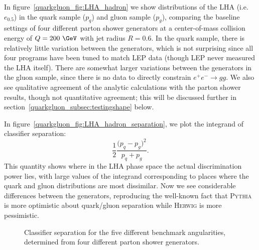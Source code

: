 \documentclass[11pt]{cernrep}
\begin{document}
In figure~\ref{quarkgluon_fig:LHA_hadron} we show distributions of the LHA (i.e.~$e_{0.5}$) in the quark sample ($p_q$) and gluon sample ($p_g$), comparing the baseline settings of four different parton shower generators at a center-of-mass collision energy of $Q = 200~\GeV$ with jet radius $R = 0.6$. In the quark sample, there is relatively little variation between the generators, which is not surprising since all four programs have been tuned to match LEP data (though LEP never measured the LHA itself).  There are somewhat larger variations between the generators in the gluon sample, since there is no data to directly constrain $e^+ e^- \to gg$.  We also see qualitative agreement of the analytic calculations with the parton shower results, though not quantitative agreement; this will be discussed further in section~\ref{quarkgluon_subsec:testingshape} below.  


In figure~\ref{quarkgluon_fig:LHA_hadron_separation}, we plot the integrand of classifier separation:
\begin{equation}
\label{eq:deltaintegrand}
\frac{1}{2} \frac{\bigl(p_q - p_g\bigr)^2}{p_q + p_g}.
\end{equation}
This quantity shows where in the LHA phase space the actual discrimination power lies, with large values of the integrand corresponding to places where the quark and gluon distributions are most dissimilar.  Now we see considerable differences between the generators, reproducing the well-known fact that \textsc{Pythia} is more optimistic about quark/gluon separation while \textsc{Herwig} is more pessimistic.

\begin{figure}
\centering
{}
\caption{Classifier separation for the five different benchmark angularities, determined from four different parton shower generators.}
\label{fig:summary_hadron_all}
\end{figure}
\end{document}
